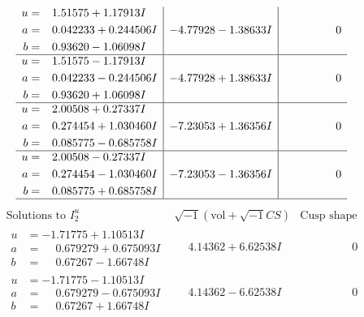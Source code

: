 \documentclass[1p]{elsarticle_modified}
\theoremstyle{definition}
\newcommand{\I}{\sqrt{-1}}
\begin{document}
$$\begin{array}{c|c|c}
\begin{aligned}
u &= \phantom{-}1.51575 + 1.17913 I \\
a &= \phantom{-}0.042233 + 0.244506 I \\
b &= \phantom{-}0.93620 - 1.06098 I\end{aligned}
 & -4.77928 - 1.38633 I & \phantom{-0.000000 } 0 \\ \hline\begin{aligned}
u &= \phantom{-}1.51575 - 1.17913 I \\
a &= \phantom{-}0.042233 - 0.244506 I \\
b &= \phantom{-}0.93620 + 1.06098 I\end{aligned}
 & -4.77928 + 1.38633 I & \phantom{-0.000000 } 0 \\ \hline\begin{aligned}
u &= \phantom{-}2.00508 + 0.27337 I \\
a &= \phantom{-}0.274454 + 1.030460 I \\
b &= \phantom{-}0.085775 - 0.685758 I\end{aligned}
 & -7.23053 + 1.36356 I & \phantom{-0.000000 } 0 \\ \hline\begin{aligned}
u &= \phantom{-}2.00508 - 0.27337 I \\
a &= \phantom{-}0.274454 - 1.030460 I \\
b &= \phantom{-}0.085775 + 0.685758 I\end{aligned}
 & -7.23053 - 1.36356 I & \phantom{-0.000000 } 0\\
 \hline 
 \end{array}$$\newpage$$\begin{array}{c|c|c}  
\text{Solutions to }I^u_{2}& \I (\text{vol} + \sqrt{-1}CS) & \text{Cusp shape}\\
 \hline 
\begin{aligned}
u &= -1.71775 + 1.10513 I \\
a &= \phantom{-}0.679279 + 0.675093 I \\
b &= \phantom{-}0.67267 - 1.66748 I\end{aligned}
 & \phantom{-}4.14362 + 6.62538 I & \phantom{-0.000000 } 0 \\ \hline\begin{aligned}
u &= -1.71775 - 1.10513 I \\
a &= \phantom{-}0.679279 - 0.675093 I \\
b &= \phantom{-}0.67267 + 1.66748 I\end{aligned}
 & \phantom{-}4.14362 - 6.62538 I & \phantom{-0.000000 } 0 \\ \hline\begin{aligned}

\end{aligned}
\end{array}$$
\end{document}
